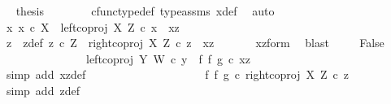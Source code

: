 \begin{isabellebody}
\ \isamarkupfalse%
\ {\isacharquery}{\kern0pt}thesis\isanewline
\ \ \ \ \ \ \isamarkupfalse%
\ cfunc{\isacharunderscore}{\kern0pt}type{\isacharunderscore}{\kern0pt}def\ type{\isacharunderscore}{\kern0pt}assms{\isacharparenleft}{\kern0pt}{}{\isacharparenright}{\kern0pt}\ x{\isacharunderscore}{\kern0pt}def\ \isamarkupfalse%
\ auto\isanewline
\ \isamarkupfalse%
\isanewline
\ \ \ \isamarkupfalse%
\ {\isachardoublequoteopen}{\isasymnexists}x{\isachardot}{\kern0pt}\ x\ {\isasymin}\isactrlsub c\ X\ {\isasymand}\ left{\isacharunderscore}{\kern0pt}coproj\ X\ Z\ {\isasymcirc}\isactrlsub c\ x\ {\isacharequal}{\kern0pt}\ xz{\isachardoublequoteclose}\isanewline
\ \ \ \isamarkupfalse%
\ \isamarkupfalse%
\ z\ \ z{\isacharunderscore}{\kern0pt}def{\isacharcolon}{\kern0pt}\ {\isachardoublequoteopen}z\ {\isasymin}\isactrlsub c\ Z\ {\isasymand}\ right{\isacharunderscore}{\kern0pt}coproj\ X\ Z\ {\isasymcirc}\isactrlsub c\ z\ {\isacharequal}{\kern0pt}\ xz{\isachardoublequoteclose}\isanewline
\ \ \ \ \ \isamarkupfalse%
\ xz{\isacharunderscore}{\kern0pt}form\ \isamarkupfalse%
\ blast\isanewline
\ \ \ \isamarkupfalse%
\ False\isanewline
\ \ \ \ \isamarkupfalse%
\ {\isacharminus}{\kern0pt}\ \isanewline
\ \ \ \ \ \ \isamarkupfalse%
\ {\isachardoublequoteopen}left{\isacharunderscore}{\kern0pt}coproj\ Y\ W\ {\isasymcirc}\isactrlsub c\ y\ {\isacharequal}{\kern0pt}\ {\isacharparenleft}{\kern0pt}f\ {\isasymbowtie}\isactrlsub f\ g{\isacharparenright}{\kern0pt}\ {\isasymcirc}\isactrlsub c\ xz{\isachardoublequoteclose}\isanewline
\ \ \ \ \ \ \ \ \isamarkupfalse%
\ {\isacharparenleft}{\kern0pt}simp\ add{\isacharcolon}{\kern0pt}\ xz{\isacharunderscore}{\kern0pt}def{\isacharparenright}{\kern0pt}\ \ \ \ \ \ \ \ \ \isanewline
\ \ \ \ \ \ \isamarkupfalse%
\ \isamarkupfalse%
\ {\isachardoublequoteopen}{\isachardot}{\kern0pt}{\isachardot}{\kern0pt}{\isachardot}{\kern0pt}\ {\isacharequal}{\kern0pt}\ {\isacharparenleft}{\kern0pt}f\ {\isasymbowtie}\isactrlsub f\ g{\isacharparenright}{\kern0pt}\ {\isasymcirc}\isactrlsub c\ right{\isacharunderscore}{\kern0pt}coproj\ X\ Z\ {\isasymcirc}\isactrlsub c\ z{\isachardoublequoteclose}\isanewline
\ \ \ \ \ \ \ \ \isamarkupfalse%
\ {\isacharparenleft}{\kern0pt}simp\ add{\isacharcolon}{\kern0pt}\ z{\isacharunderscore}{\kern0pt}def{\isacharparenright}{\kern0pt}\isanewline

\end{isabellebody}
